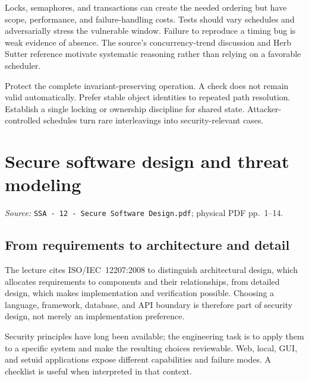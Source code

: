 \documentclass[11pt,a4paper]{article}
\newcommand{\currentmodule}{Contents}
\newcommand{\source}[2]{\textcolor{muted}{\small\textit{Source:} \nolinkurl{#1}; physical PDF pp.~#2.}\par\medskip}
\newcommand{\module}[2]{\par\Needspace{8\baselineskip}\gdef\currentmodule{#1}\section{#1}\label{#2}}
\numberwithin{figure}{section}
\begin{document}
Locks, semaphores, and transactions can create the needed ordering but have scope, performance, and failure-handling costs. Tests should vary schedules and adversarially stress the vulnerable window. Failure to reproduce a timing bug is weak evidence of absence. The source's concurrency-trend discussion and Herb Sutter reference motivate systematic reasoning rather than relying on a favorable scheduler.

\begin{takeaway}
Protect the complete invariant-preserving operation. A check does not remain valid automatically. Prefer stable object identities to repeated path resolution. Establish a single locking or ownership discipline for shared state. Attacker-controlled schedules turn rare interleavings into security-relevant cases.
\end{takeaway}

\module{Secure software design and threat modeling}{sec:design}
\source{SSA - 12 - Secure Software Design.pdf}{1--14}
\subsection{From requirements to architecture and detail}
The lecture cites ISO/IEC~12207:2008 to distinguish architectural design, which allocates requirements to components and their relationships, from detailed design, which makes implementation and verification possible. Choosing a language, framework, database, and API boundary is therefore part of security design, not merely an implementation preference.

Security principles have long been available; the engineering task is to apply them to a specific system and make the resulting choices reviewable. Web, local, GUI, and setuid applications expose different capabilities and failure modes. A checklist is useful when interpreted in that context.
\end{document}
